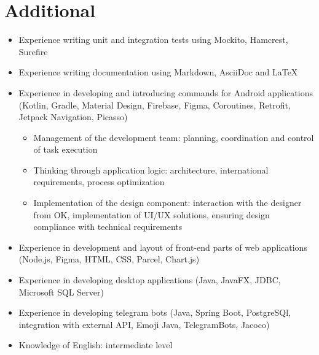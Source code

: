 \documentclass[a4paper,9pt]{report}
\newcommand{\bulletItem}[1]{\item[$\bullet$] #1}
\begin{document}
\section{Additional}
\begin{itemize}
\bulletItem{Experience writing unit and integration tests using Mockito, Hamcrest, Surefire}
\bulletItem{Experience writing documentation using Markdown, AsciiDoc and LaTeX}
\bulletItem{Experience in developing and introducing commands for Android applications (Kotlin, Gradle, Material Design, Firebase, Figma, Coroutines, Retrofit, Jetpack Navigation, Picasso)}
\begin{itemize}
\bulletItem Management of the development team: planning, coordination and control of task execution
\bulletItem Thinking through application logic: architecture, international requirements, process optimization
\bulletItem Implementation of the design component: interaction with the designer from OK, implementation of UI/UX solutions, ensuring design compliance with technical requirements
\end{itemize}
\bulletItem{Experience in development and layout of front-end parts of web applications (Node.js, Figma, HTML, CSS, Parcel, Chart.js)}
\bulletItem{Experience in developing desktop applications (Java, JavaFX, JDBC, Microsoft SQL Server)}
\bulletItem{Experience in developing telegram bots (Java, Spring Boot, PostgreSQl, integration with external API, Emoji Java, TelegramBots, Jacoco)}
\bulletItem{Knowledge of English: intermediate level}
\end{itemize}
\end{document}
